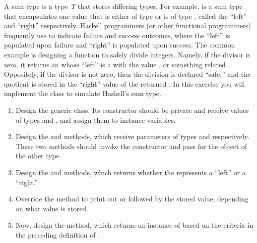 A sum type is a type~$T$ that stores differing types.
For example,  is a sum type that encapsulates one value that is either of type  or is of type , called the ``left'' and ``right'' respectively.
Haskell programmers (or other functional programmers) frequently use  to indicate failure and success outcomes, where the ``left'' is populated upon failure and ``right'' is populated upon success.
The common example is designing a function to safely divide integers.
Namely, if the divisor is zero, it returns an  whose ``left'' is a  with the value , or something related.
Oppositely, if the divisor is not zero, then the division is declared ``safe,'' and the quotient is stored in the ``right'' value of the returned .
In this exercise you will implement the  class to simulate Haskell's  sum type.

\begin{enumerate}[label=(\alph*)]
    \item Design the generic  class. Its constructor should be private and receive values of types  and , and assign them to instance variables.
    \item Design the  and  methods, which receive parameters of types  and  respectively. These two methods should invoke the  constructor and pass  for the object of the other type.
    \item Design the  and  methods, which returns whether the  represents a ``left'' or a ``right.''
    \item Override the  method to print out  or  followed by the stored value, depending on what value is stored.
    \item Now, design the  method, which returns an instance of  based on the criteria in the preceding definition of .
\end{enumerate}

